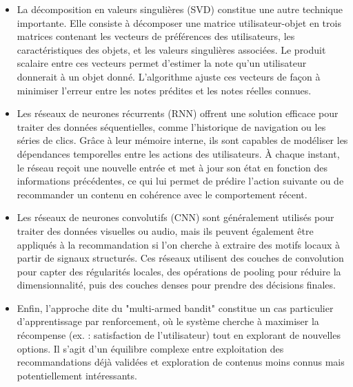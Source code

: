 \documentclass{article}
\begin{document}
\begin{itemize}
    \item La décomposition en valeurs singulières (SVD) constitue une autre technique importante. Elle consiste à décomposer une matrice utilisateur-objet en trois matrices contenant les vecteurs de préférences des utilisateurs, les caractéristiques des objets, et les valeurs singulières associées. Le produit scalaire entre ces vecteurs permet d’estimer la note qu’un utilisateur donnerait à un objet donné. L’algorithme ajuste ces vecteurs de façon à minimiser l’erreur entre les notes prédites et les notes réelles connues.
    \item Les réseaux de neurones récurrents (RNN) offrent une solution efficace pour traiter des données séquentielles, comme l’historique de navigation ou les séries de clics. Grâce à leur mémoire interne, ils sont capables de modéliser les dépendances temporelles entre les actions des utilisateurs. À chaque instant, le réseau reçoit une nouvelle entrée et met à jour son état en fonction des informations précédentes, ce qui lui permet de prédire l’action suivante ou de recommander un contenu en cohérence avec le comportement récent.
    \item Les réseaux de neurones convolutifs (CNN) sont généralement utilisés pour traiter des données visuelles ou audio, mais ils peuvent également être appliqués à la recommandation si l’on cherche à extraire des motifs locaux à partir de signaux structurés. Ces réseaux utilisent des couches de convolution pour capter des régularités locales, des opérations de pooling pour réduire la dimensionnalité, puis des couches denses pour prendre des décisions finales.
    \item Enfin, l’approche dite du "multi-armed bandit" constitue un cas particulier d’apprentissage par renforcement, où le système cherche à maximiser la récompense (ex. : satisfaction de l’utilisateur) tout en explorant de nouvelles options. Il s’agit d’un équilibre complexe entre exploitation des recommandations déjà validées et exploration de contenus moins connus mais potentiellement intéressants.
\end{itemize}
\end{document}
